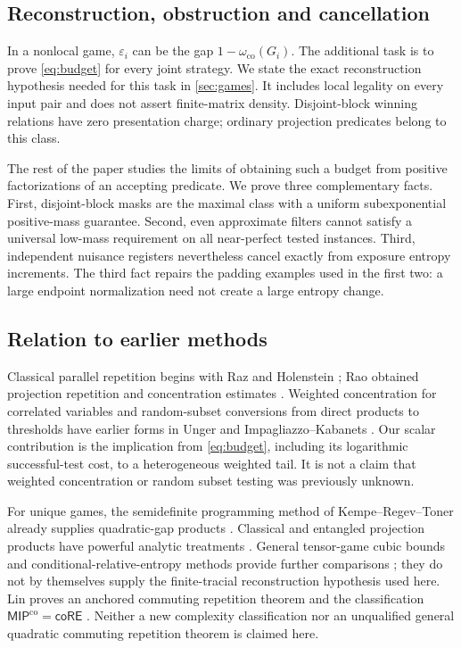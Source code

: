 \documentclass[11pt,reqno]{amsart}
\numberwithin{equation}{section}
\theoremstyle{definition}
\theoremstyle{remark}
\newcommand{\eps}{\varepsilon}
\newcommand{\co}{\mathrm{co}}
\begin{document}
\subsection{Reconstruction, obstruction and cancellation}
In a nonlocal game, \(\eps_i\) can be the gap \(1-\omega_{\co}(G_i)\). The additional task is to prove \eqref{eq:budget} for every joint strategy. We state the exact reconstruction hypothesis needed for this task in \cref{sec:games}. It includes local legality on every input pair and does not assert finite-matrix density. Disjoint-block winning relations have zero presentation charge; ordinary projection predicates belong to this class.

The rest of the paper studies the limits of obtaining such a budget from positive factorizations of an accepting predicate. We prove three complementary facts. First, disjoint-block masks are the maximal class with a uniform subexponential positive-mass guarantee. Second, even approximate filters cannot satisfy a universal low-mass requirement on all near-perfect tested instances. Third, independent nuisance registers nevertheless cancel exactly from exposure entropy increments. The third fact repairs the padding examples used in the first two: a large endpoint normalization need not create a large entropy change.

\subsection{Relation to earlier methods}
Classical parallel repetition begins with Raz and Holenstein \cite{Raz,Holenstein}; Rao obtained projection repetition and concentration estimates \cite{Rao}. Weighted concentration for correlated variables and random-subset conversions from direct products to thresholds have earlier forms in Unger and Impagliazzo--Kabanets \cite{Unger,IK}. Our scalar contribution is the implication from \eqref{eq:budget}, including its logarithmic successful-test cost, to a heterogeneous weighted tail. It is not a claim that weighted concentration or random subset testing was previously unknown.

For unique games, the semidefinite programming method of Kempe--Regev--Toner already supplies quadratic-gap products \cite{KRT}. Classical and entangled projection products have powerful analytic treatments \cite{DS,DSV}. General tensor-game cubic bounds and conditional-relative-entropy methods provide further comparisons \cite{Song,Jain}; they do not by themselves supply the finite-tracial reconstruction hypothesis used here. Lin proves an anchored commuting repetition theorem and the classification \(\mathsf{MIP}^{\co}=\mathsf{coRE}\) \cite{LinMIP}. Neither a new complexity classification nor an unqualified general quadratic commuting repetition theorem is claimed here.
\end{document}
